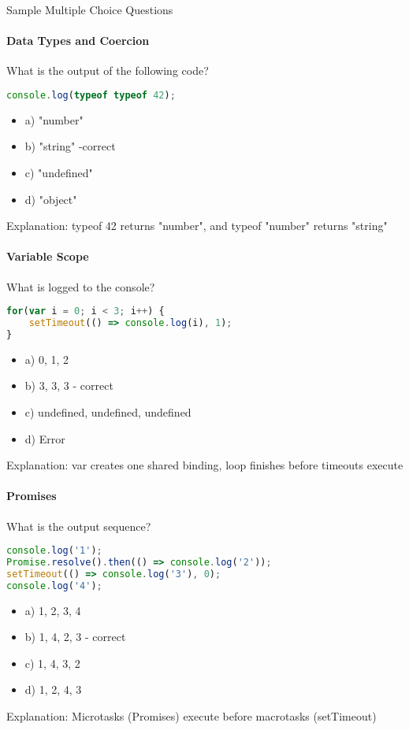 \begin{KR}{Sample Multiple Choice Questions}

\paragraph{Data Types and Coercion}
What is the output of the following code?
\begin{lstlisting}[language=JavaScript, style=basesmol]
console.log(typeof typeof 42);
\end{lstlisting}
\begin{itemize}
    \item a) "number"
    \item b) "string" -correct
    \item c) "undefined"
    \item d) "object"
\end{itemize}
Explanation: typeof 42 returns "number", and typeof "number" returns "string"

\paragraph{Variable Scope}
What is logged to the console?
\begin{lstlisting}[language=JavaScript, style=basesmol]
for(var i = 0; i < 3; i++) {
    setTimeout(() => console.log(i), 1);
}
\end{lstlisting}
\begin{itemize}
    \item a) 0, 1, 2
    \item b) 3, 3, 3 - correct
    \item c) undefined, undefined, undefined
    \item d) Error
\end{itemize}
Explanation: var creates one shared binding, loop finishes before timeouts execute

\paragraph{Promises}
What is the output sequence?
\begin{lstlisting}[language=JavaScript, style=basesmol]
console.log('1');
Promise.resolve().then(() => console.log('2'));
setTimeout(() => console.log('3'), 0);
console.log('4');
\end{lstlisting}
\begin{itemize}
    \item a) 1, 2, 3, 4
    \item b) 1, 4, 2, 3 - correct
    \item c) 1, 4, 3, 2
    \item d) 1, 2, 4, 3
\end{itemize}
Explanation: Microtasks (Promises) execute before macrotasks (setTimeout)
\end{KR}


